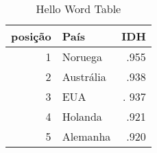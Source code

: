 \documentclass[12pt, twocolumn, a4paper]{article}
\begin{document}
	\begin{table}[h]
\centering
\caption{Hello Word Table}
	\begin{tabular}{r|l|r}
	\hline
	posição & País & IDH\\
	\hline
	1 & Noruega        & .955 \\
	\hline
	2 & Austrália 	   & .938 \\
	\hline
	3 & EUA            &. 937 \\
	\hline
	4 & Holanda        & .921 \\
	\hline
	5 & Alemanha       & .920 \\
	\hline
	
	\end{tabular}

\end{table}
	
  
	
	
	
\end{document}
